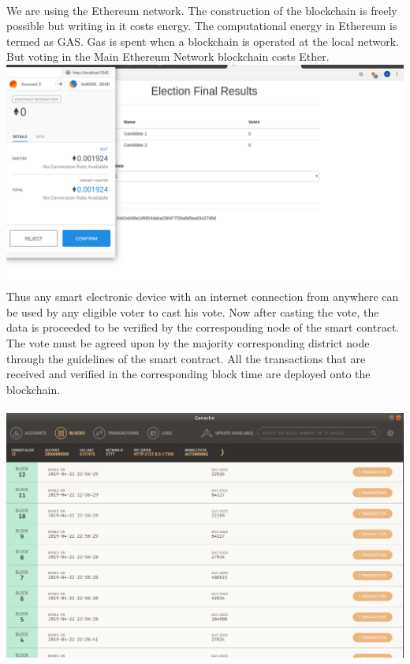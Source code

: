 \documentclass{article}
\begin{document}
 \\
 We are using the Ethereum network. The construction of the blockchain is freely possible but writing in it costs energy. The computational energy in Ethereum is termed as GAS. Gas is spent when a blockchain is operated at the local network. But voting in the Main Ethereum Network blockchain costs Ether. 
 \\
 \includegraphics[scale=0.45]{chrome3.png}
 \\
 Thus any smart electronic device with an internet connection from anywhere can be used by any eligible voter to cast his vote. Now after casting the vote, the data is proceeded to be veriﬁed by the corresponding node of the smart contract. The vote must be agreed upon by the majority corresponding district node through the guidelines of the smart contract. All the transactions that are received and veriﬁed in the corresponding block time are deployed onto the blockchain.\\
 \\
 \includegraphics[scale=0.45]{ganache3.png}
\end{document}

